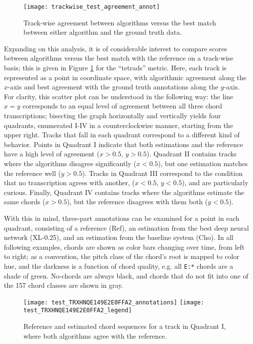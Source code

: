 \begin{figure}[t!]
\centering
\texttt{[image: trackwise\_test\_agreement\_annot]}
\caption{Track-wise agreement between algorithms versus the best match between either algorithm and the ground truth data.}
\label{fig:trackwise_test_agreement}
\end{figure}


Expanding on this analysis, it is of considerable interest to compare scores between algorithms versus the best match with the reference on a track-wise basis; this is given in Figure \ref{fig:trackwise_test_agreement} for the ``tetrads'' metric.
Here, each track is represented as a point in coordinate space, with algorithmic agreement along the $x$-axis and best agreement with the ground truth annotations along the $y$-axis.
For clarity, this scatter plot can be understood in the following way:
the line $x=y$ corresponds to an equal level of agreement between all three chord transcriptions;
bisecting the graph horizontally and vertically yields four quadrants, enumerated I-IV in a counterclockwise manner, starting from the upper right.
Tracks that fall in each quadrant correspond to a different kind of behavior.
Points in Quadrant I indicate that both estimations and the reference have a high level of agreement ($x > 0.5$, $y > 0.5$).
Quadrant II contains tracks where the algorithms disagree significantly ($x < 0.5$), but one estimation matches the reference well ($y > 0.5$).
Tracks in Quadrant III correspond to the condition that no transcription agrees with another, ($x < 0.5$, $y < 0.5$), and are particularly curious.
Finally, Quadrant IV contains tracks where the algorithms estimate the same chords ($x > 0.5$), but the reference disagrees with them both ($y < 0.5$).


With this in mind, three-part annotations can be examined for a point in each quadrant, consisting of a reference (Ref), an estimation from the best deep neural network (XL-0.25), and an estimation from the baseline system (Cho).
In all following examples, chords are shown as color bars changing over time, from left to right;
as a convention, the pitch class of the chord's root is mapped to color hue, and the darkness is a function of chord quality, e.g. all \texttt{E:*} chords are a shade of green.
No-chords are always black, and chords that do not fit into one of the 157 chord classes are shown in gray.

\begin{figure}[t!]
\centering
\texttt{[image: test\_TRXHNQE149E2E0FFA2\_annotations]}
\texttt{[image: test\_TRXHNQE149E2E0FFA2\_legend]}
\caption{Reference and estimated chord sequences for a track in Quadrant I, where both algorithms agree with the reference.}
\label{fig:test_quadI}
\end{figure}

